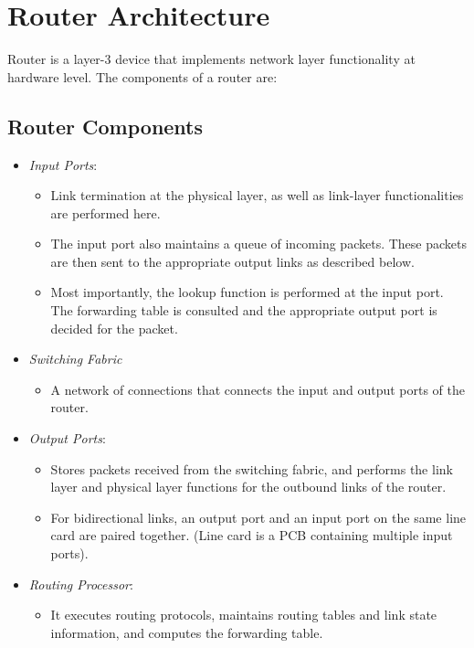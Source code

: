 \documentclass[a4paper]{article}
\theoremstyle{plain}
\theoremstyle{definition}
\begin{document}
\section{Router Architecture}
Router is a layer-3 device that implements network layer functionality at hardware level. The components of a router are:
\subsection{Router Components}

\begin{itemize}
    \item \textit{Input Ports}:
    \begin{itemize}
        \item Link termination at the physical layer, as well as link-layer functionalities are performed here.
        
        \item The input port also maintains a queue of incoming packets. These packets are then sent to the appropriate output links as described below.
        
        \item Most importantly, the lookup function is performed at the input port. The forwarding table is consulted and the appropriate output port is decided for the packet.
        
    
    \end{itemize}
    
    \item \textit{Switching Fabric}
    \begin{itemize}
        \item A network of connections that connects the input and output ports of the router.
        
    \end{itemize}

    \item \textit{Output Ports}:
    \begin{itemize}
        \item Stores packets received from the switching fabric, and performs the link layer and physical layer functions for the outbound links of the router.
        
        \item For bidirectional links, an output port and an input port on the same line card are paired together. (Line card is a PCB containing multiple input ports).
    \end{itemize}
    
    \item \textit{Routing Processor}:
    \begin{itemize}
        \item It executes routing protocols, maintains routing tables and link state information, and computes the forwarding table.
    \end{itemize}
\end{itemize}
\end{document}
